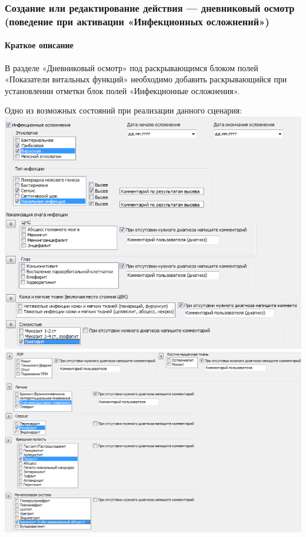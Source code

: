 \documentclass[a4paper,8pt]{report} %
\begin{document}
{ \subsubsection{Создание или редактирование действия — дневниковый осмотр (поведение при активации «Инфекционных осложнений»)}
    \paragraph*{Краткое описание}
       В разделе «Дневниковый осмотр» под раскрывающимся блоком полей «Показатели
       витальных функций» необходимо добавить раскрывающийся при установлении отметки
       блок полей «Инфекционные осложнения».

       Одно из возможных состояний при реализации данного сценария:
       \includegraphics[width=\textwidth]{state_example}
       \includegraphics[width=\textwidth]{state_example_2}

}
\end{document}
